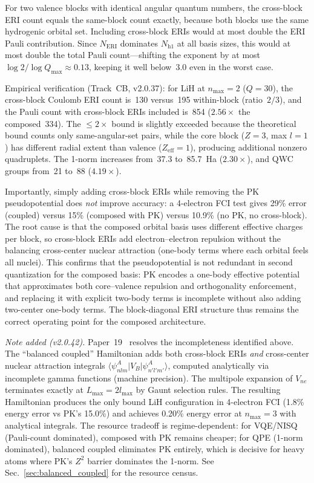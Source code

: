 \documentclass[aps,pra,twocolumn,superscriptaddress,longbibliography]{revtex4-2}
\begin{document}
For two valence blocks with identical angular quantum numbers, the
cross-block ERI count equals the same-block count exactly, because
both blocks use the same hydrogenic orbital set.  Including
cross-block ERIs would at most double the ERI Pauli contribution.
Since $N_{\mathrm{ERI}}$ dominates $N_{\mathrm{h1}}$ at all basis
sizes, this would at most double the total Pauli count---shifting
the exponent by at most $\log 2 / \log Q_{\max} \approx 0.13$,
keeping it well below~3.0 even in the worst case.

Empirical verification (Track~CB, v2.0.37): for LiH at $n_{\max}=2$
($Q = 30$), the cross-block Coulomb ERI count is~130 versus~195
within-block (ratio~$2/3$), and the Pauli count with cross-block
ERIs included is~854 ($2.56\times$ the composed~334).  The $\le
2\times$ bound is slightly exceeded because the theoretical bound
counts only same-angular-set pairs, while the core block
($Z = 3$, max $l = 1$) has different radial extent than valence
($Z_{\mathrm{eff}} = 1$), producing additional nonzero quadruplets.
The 1-norm increases from~37.3 to~85.7~Ha ($2.30\times$), and QWC
groups from~21 to~88 ($4.19\times$).

Importantly, simply adding cross-block ERIs while removing the PK
pseudopotential does \emph{not} improve accuracy: a 4-electron FCI
test gives 29\% error (coupled) versus 15\% (composed with PK)
versus 10.9\% (no PK, no cross-block).  The root cause is that the
composed orbital basis uses different effective charges per block,
so cross-block ERIs add electron--electron repulsion without the
balancing cross-center nuclear attraction (one-body terms where
each orbital feels all nuclei).  This confirms that the
pseudopotential is not redundant in second quantization for the
composed basis: PK encodes a one-body effective potential that
approximates both core--valence repulsion and orthogonality
enforcement, and replacing it with explicit two-body terms is
incomplete without also adding two-center one-body terms.
The block-diagonal ERI structure thus remains the correct
operating point for the composed architecture.

\textit{Note added (v2.0.42).}
Paper~19~\cite{loutey_paper19} resolves the incompleteness identified above.
The ``balanced coupled'' Hamiltonian adds both cross-block ERIs
\emph{and} cross-center nuclear attraction integrals
$\langle \psi_{nlm}^A | V_B | \psi_{n'l'm'}^A \rangle$, computed
analytically via incomplete gamma functions (machine precision).
The multipole expansion of $V_{ne}$ terminates exactly at
$L_{\max} = 2 l_{\max}$ by Gaunt selection rules.  The resulting
Hamiltonian produces the only bound LiH configuration in
4-electron FCI (1.8\% energy error vs PK's 15.0\%) and achieves
0.20\% energy error at $n_{\max} = 3$ with analytical integrals.
The resource tradeoff is regime-dependent: for VQE/NISQ (Pauli-count
dominated), composed with PK remains cheaper; for QPE (1-norm
dominated), balanced coupled eliminates PK entirely, which is
decisive for heavy atoms where PK's $Z^2$ barrier dominates
the 1-norm.  See Sec.~\ref{sec:balanced_coupled} for the
resource census.
\end{document}
